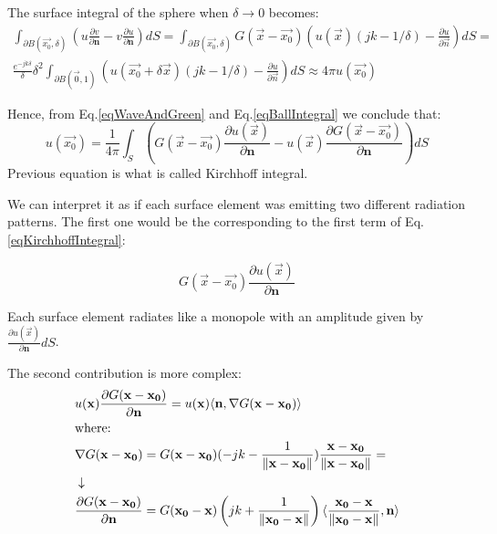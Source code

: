 The surface integral of the sphere when $\delta \rightarrow 0$ becomes:
\begin{multline}
\int_{\partial B(\vec{x_0}, \delta)} \left(u\frac{\partial v}{\partial \mathbf{n}} - v \frac{\partial u}{\partial \mathbf{n}}\right) dS = \int_{\partial B(\vec{x_0}, \delta)} G(\vec{x} - \vec{x_0}) \left( u(\vec{x})(jk - 1/\delta) - \frac{\partial u}{\partial \vec{n}} \right) dS = \\
\frac{e^{-jk\delta}}{\delta}\delta^2 \int_{\partial B(\vec{0}, 1)} \left(u(\vec{x_0} + \delta\vec{x})(jk - 1/\delta) - \frac{\partial u}{\partial \vec{n}} \right) dS \approx 4\pi u(\vec{x_0})
\label{eqBallIntegral}
\end{multline}

Hence, from Eq.\ref{eqWaveAndGreen} and Eq.\ref{eqBallIntegral} we conclude that:
\begin{equation}
u(\vec{x_0}) = \frac{1}{4\pi} \int_{S} \left(G(\vec{x} - \vec{x_0}) \frac{\partial u(\vec{x})}{\partial \mathbf{n}} - u(\vec{x})\frac{\partial G(\vec{x} - \vec{x_0})}{\partial \mathbf{n}} \right) dS
\label{eqKirchhoffIntegral}
\end{equation}
Previous equation is what is called Kirchhoff integral.

We can interpret it as if each surface element was emitting two different radiation patterns. The first one would be the corresponding to the first term of Eq.\ref{eqKirchhoffIntegral}:

\begin{equation}
G(\vec{x} - \vec{x_0}) \frac{\partial u(\vec{x})}{\partial \mathbf{n}}
\end{equation}

Each surface element radiates like a monopole with an amplitude given by $\frac{\partial u(\vec{x})}{\partial \mathbf{n}} dS$.

The second contribution is more complex:
\begin{equation}
\begin{aligned}
&u(\mathbf{x})\frac{\partial G(\mathbf{x} - \mathbf{x_0})}{\partial \mathbf{n}} = u(\mathbf{x})\langle \mathbf{n} , \nabla G(\mathbf{x} - \mathbf{x_0}) \rangle\\
&\text{where:}\\
&\nabla G(\mathbf{x} - \mathbf{x_0}) = G(\mathbf{x} - \mathbf{x_0})(-jk - \frac{1}{\left\| \mathbf{x} - \mathbf{x_0} \right\|})\frac{\mathbf{x} - \mathbf{x_0}}{\left\| \mathbf{x} - \mathbf{x_0} \right\|} = \\
&\downarrow \\
&\frac{\partial G(\mathbf{x} - \mathbf{x_0})}{\partial \mathbf{n}} = G(\mathbf{x_0} - \mathbf{x})\left( jk + \frac{1}{\left\| \mathbf{x_0} - \mathbf{x} \right\|} \right) \langle \frac{\mathbf{x_0} - \mathbf{x}}{\left\| \mathbf{x_0} - \mathbf{x} \right\|} , \mathbf{n} \rangle
\end{aligned}
\end{equation}

